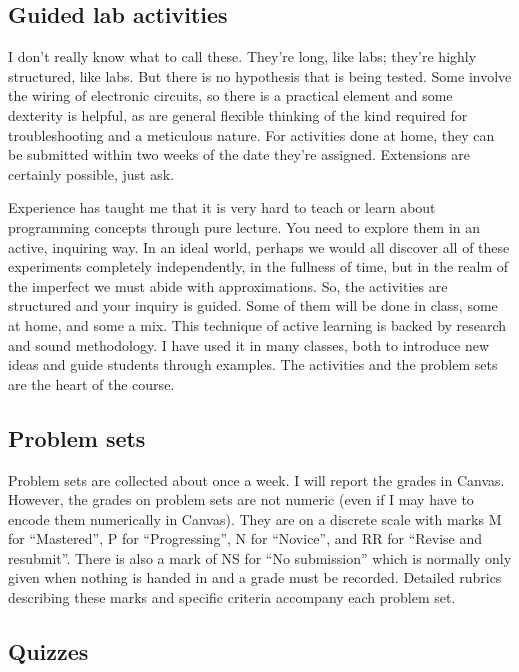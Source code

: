 \documentclass[symmetric]{tufte-handout}
\begin{document}
\subsection{Guided lab activities} %
\label{sub:workshops}

    I don't really know what to call these. They're long, like labs; they're
    highly structured, like labs. But there is no hypothesis that is being
    tested. Some involve the wiring of electronic circuits, so there is a
    practical element and some dexterity is helpful, as are general flexible
    thinking of the kind required for troubleshooting and a meticulous nature.
    For activities done at home, they can be submitted within two weeks of
    the date they're assigned. Extensions are certainly possible, just ask.

    Experience has taught me that it is very hard to teach or learn about
    programming concepts through pure lecture. You need to explore them in an
    active, inquiring way. In an ideal world, perhaps we would all discover
    all of these experiments completely independently, in the fullness of
    time, but in the realm of the imperfect we must abide with approximations.
    So, the activities are structured and your inquiry is guided. Some of them
    will be done in class, some at home, and some a mix. This technique of
    active learning is backed by research and sound methodology. I have used
    it in many classes, both to introduce  new ideas and guide students
    through examples. The activities and the problem sets are the heart of the
    course.


\subsection{Problem sets}

    Problem sets are collected about once a week. I will report the grades in
    Canvas. However, the grades on problem sets are not numeric (even if I may
    have to encode them numerically in Canvas). They are on a discrete scale
    with marks M for ``Mastered'', P for ``Progressing'', N for ``Novice'',
    and RR for ``Revise and resubmit''. There is also a mark of NS for
    ``No submission'' which is normally only given when nothing is handed in
    and a grade must be recorded. Detailed rubrics describing these marks
    and specific criteria accompany each problem set.

\subsection{Quizzes}
\end{document}
